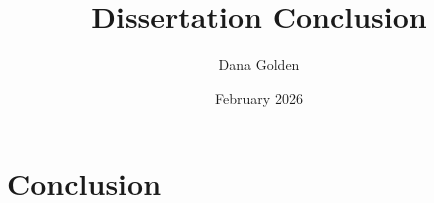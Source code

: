\documentclass{article}
\title{Dissertation Conclusion}
\author{Dana Golden}
\date{February 2026}
\begin{document}
\maketitle

\section{Conclusion}
\end{document}
